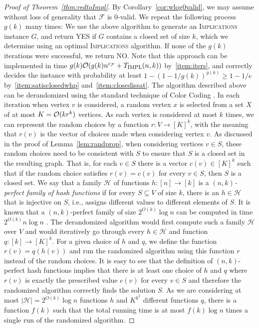 \documentclass[10pt,a4paper]{article}
\theoremstyle{plain}
\newcommand{\Oh}{{\cal O}}
\newcommand{\Impl}{\mathrm{IMPL}}
\newcommand{\confam}{\mathcal{F}}
\newcommand{\Implication}{\textsc{Implications}\xspace}
\begin{document}
\begin{proof}[Proof of Theorem~\ref{thm:redtoImpl}]
By Corollary~\ref{cor:wlog0valid}, we may assume without loss of generality that $\confam$ is 0-valid.
We repeat the following process $g(k)$ many times: We use the above algorithm to generate an \Implication instance $G$, and return YES if $G$ contains a closed set of size $k$, which we determine using an optimal \Implication algorithm. If none of the $g(k)$ iterations were successful, we return NO. Note that this approach can be implemented in time $g(k)\Oh(g(k)n^{c_\confam} + T_\Impl(n,k))$ by~\ref{item:iters}, and correctly decides the instance with probability at least $1-(1-1/g(k))^{g(k)} \ge 1-1/e$ by~\ref{item:satisclosedwhp} and~\ref{item:closedissat}.
%
The algorithm described above can be derandomized using the standard technique of Color Coding \cite{AlonYZ95}. In each iteration when vertex $v$ is considered, a random vertex $x$ is selected from a set $X$ of at most $K=\Oh(kr^k)$ vertices. As each vertex is considered at most $k$ times, we can represent the random choices by a function $r:V\to [K]^k$,  with the meaning that $r(v)$ is the vector of choices made when considering vertex $v$.  As discussed in the proof of Lemma~\ref{lem:randprop}, when considering vertices $v\in S$, these random choices need to be consistent with $S$ to ensure that $S$ is a closed set in the resulting graph. That is, for each $v\in S$ there is a vector $c(v)\in [K]^k$ such that if the random choice satisfies $r(v)=c(v)$ for every $v\in S$, then $S$ is a closed set.
%
We say that a family $\mathcal{H}$ of functions $h:[n]\to [k]$ is a {\em $(n,k)$-perfect family of hash functions} if for every $S\subseteq V$ of size $k$, there is an $h\in \mathcal{H}$ that is injective on $S$, i.e., assigns different values to different elements of $S$. It is known that a $(n,k)$-perfect family of size $2^{O(k)}\log n$ can be computed in time $2^{O(k)}n\log n$ \cite{AlonYZ95}. The derandomized algorithm would first compute such a family $\mathcal{H}$ over $V$ and would iteratively go through every $h\in \mathcal{H}$ and function $q:[k]\to [K]^k$. For a given choice of $h$ and $q$, we define the function $r(v)=q(h(v))$ and run the randomized algorithm using this function $r$ instead of the random choices. It is easy to see that the definition of $(n,k)$-perfect hash functions implies that there is at least one choice of $h$ and $q$ where $r(v)$ is exactly the prescribed value $c(v)$ for every $v\in S$ and therefore the randomized algorithm correctly finds the solution $S$. As we are considering at most $|\mathcal{H}|=2^{O(k)}\log n$ functions $h$ and $K^{k^2}$ different functions $q$, there is a function $f(k)$ such that the total running time is at most $f(k)\log n$ times a single run of the randomized algorithm.
\end{proof}
%
%
%
%
\end{document}
